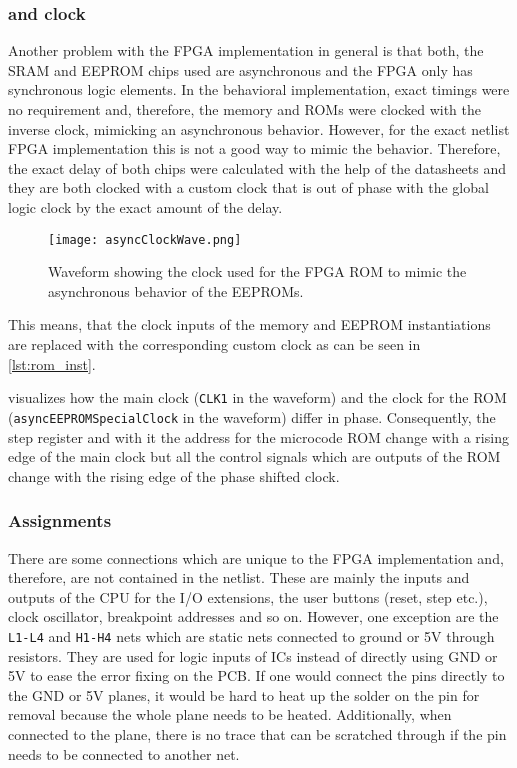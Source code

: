 \subsubsection{ and  clock}
Another problem with the \gls{FPGA} implementation in general is that both, the \gls{SRAM} and \gls{EEPROM} chips used are asynchronous and the \gls{FPGA} only has synchronous logic elements.
In the behavioral implementation, exact timings were no requirement and, therefore, the memory and \glspl{ROM} were clocked with the inverse clock, mimicking an asynchronous behavior.
However, for the exact netlist \gls{FPGA} implementation this is not a good way to mimic the behavior.
Therefore, the exact delay of both chips were calculated with the help of the datasheets and they are both clocked with a custom clock that is out of phase with the global logic clock by the exact amount of the delay.
\begin{figure}
  \centering
  \texttt{[image: asyncClockWave.png]}
  \caption{Waveform showing the clock used for the \gls{FPGA} \gls{ROM} to mimic the asynchronous behavior of the \glspl{EEPROM}.}
  \label{fig:asyncClockWave}
\end{figure}

This means, that the clock inputs of the memory and \gls{EEPROM} instantiations are replaced with the corresponding custom clock as can be seen in \cref{lst:rom_inst}.

 visualizes how the main clock (\texttt{CLK1} in the waveform) and the clock for the \gls{ROM} (\texttt{asyncEEPROMSpecialClock} in the waveform) differ in phase.
Consequently, the step register and with it the address for the microcode \gls{ROM} change with a rising edge of the main clock but all the control signals which are outputs of the \gls{ROM} change with the rising edge of the phase shifted clock.

\subsubsection{Assignments}
There are some connections which are unique to the \gls{FPGA} implementation and, therefore, are not contained in the netlist.
These are mainly the inputs and outputs of the \gls{CPU} for the I/O extensions, the user buttons (reset, step etc.), clock oscillator, breakpoint addresses and so on.
However, one exception are the \texttt{L1-L4} and \texttt{H1-H4} nets which are static nets connected to ground or 5V through resistors.
They are used for logic inputs of \glspl{IC} instead of directly using GND or 5V to ease the error fixing on the \gls{PCB}.
If one would connect the pins directly to the GND or 5V planes, it would be hard to heat up the solder on the pin for removal because the whole plane needs to be heated.
Additionally, when connected to the plane, there is no trace that can be scratched through if the pin needs to be connected to another net.


